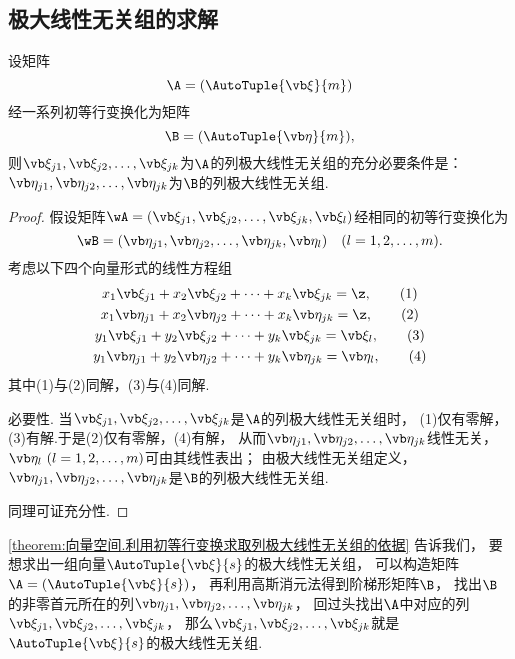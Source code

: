 \subsection{极大线性无关组的求解}
\begin{theorem}\label{theorem:向量空间.利用初等行变换求取列极大线性无关组的依据}
设矩阵\[
	\A=(\AutoTuple{\a}{m})
\]
经一系列初等行变换化为矩阵\[
	\B=(\AutoTuple{\b}{m}),
\]
则\(\a_{j1},\a_{j2},\dotsc,\a_{jk}\)为\(\A\)的列极大线性无关组的充分必要条件是：
\(\b_{j1},\b_{j2},\dotsc,\b_{jk}\)为\(\B\)的列极大线性无关组.
\begin{proof}
假设矩阵\(\wA=(\a_{j1},\a_{j2},\dotsc,\a_{jk},\a_l)\)经相同的初等行变换化为\[
	\wB=(\b_{j1},\b_{j2},\dotsc,\b_{jk},\b_l) \quad(l=1,2,\dotsc,m).
\]
考虑以下四个向量形式的线性方程组
\begin{gather}
	x_1 \a_{j1} + x_2 \a_{j2} + \dotsb + x_k \a_{jk} = \z, \tag1 \\
	x_1 \b_{j1} + x_2 \b_{j2} + \dotsb + x_k \b_{jk} = \z, \tag2 \\
	y_1 \a_{j1} + y_2 \a_{j2} + \dotsb + y_k \a_{jk} = \a_l, \tag3 \\
	y_1 \b_{j1} + y_2 \b_{j2} + \dotsb + y_k \b_{jk} = \b_l, \tag4
\end{gather}
其中(1)与(2)同解，(3)与(4)同解.

必要性.
当\(\a_{j1},\a_{j2},\dotsc,\a_{jk}\)是\(\A\)的列极大线性无关组时，
(1)仅有零解，(3)有解.于是(2)仅有零解，(4)有解，
从而\(\b_{j1},\b_{j2},\dotsc,\b_{jk}\)线性无关，
\(\b_l\ (l=1,2,\dotsc,m)\)可由其线性表出；
由极大线性无关组定义，
\(\b_{j1},\b_{j2},\dotsc,\b_{jk}\)是\(\B\)的列极大线性无关组.

同理可证充分性.
\end{proof}
\end{theorem}

\cref{theorem:向量空间.利用初等行变换求取列极大线性无关组的依据} 告诉我们，
要想求出一组向量\(\AutoTuple{\a}{s}\)的极大线性无关组，
可以构造矩阵\(\A=(\AutoTuple{\a}{s})\)，
再利用高斯消元法得到阶梯形矩阵\(\B\)，
找出\(\B\)的非零首元所在的列\(\b_{j1},\b_{j2},\dotsc,\b_{jk}\)，
回过头找出\(\A\)中对应的列\(\a_{j1},\a_{j2},\dotsc,\a_{jk}\)，
那么\(\a_{j1},\a_{j2},\dotsc,\a_{jk}\)就是\(\AutoTuple{\a}{s}\)的极大线性无关组.

